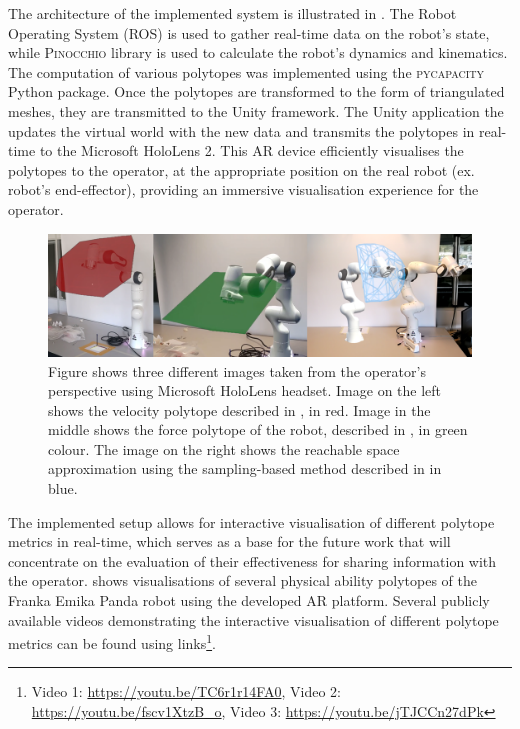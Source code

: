The architecture of the implemented system is illustrated in . The Robot Operating System (ROS) is used to gather real-time data on the robot's state, while \textsc{Pinocchio} \cite{pinocchio2021} library is used to calculate the robot's dynamics and kinematics. The computation of various polytopes was implemented using the \textsc{pycapacity} Python package. Once the polytopes are transformed to the form of triangulated meshes, they are transmitted to the Unity framework. The Unity application the updates the virtual world with the new data and transmits the polytopes in real-time to the Microsoft HoloLens 2. This AR device efficiently visualises the polytopes to the operator, at the appropriate position on the real robot (ex. robot's end-effector), providing an immersive visualisation experience for the operator.

\begin{figure}[!h]
    \centering
    \includegraphics[width=\linewidth]{Papers/images/ar_poly_dirty.png}
    \caption{Figure shows three different images taken from the operator's perspective using Microsoft HoloLens headset. Image on the left shows the velocity polytope described in , in red. Image in the middle shows the force polytope of the robot, described in , in green colour. The image on the right shows the reachable space approximation using the sampling-based method described in  in blue.}
    \label{fig:ar_images}
\end{figure}


The implemented setup allows for interactive visualisation of different polytope metrics in real-time, which serves as a base for the future work that will concentrate on the evaluation of their effectiveness for sharing information with the operator.  shows visualisations of several physical ability polytopes of the Franka Emika Panda robot using the developed AR platform. Several publicly available videos demonstrating the interactive visualisation of different polytope metrics can be found using links\footnote{Video 1: \url{https://youtu.be/TC6r1r14FA0}, Video 2: \url{https://youtu.be/fscv1XtzB_o}, Video 3: \url{https://youtu.be/jTJCCn27dPk}}.


